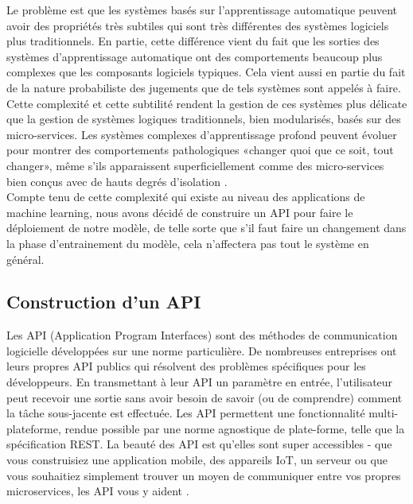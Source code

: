 \documentclass[12pt, french]{report}
\begin{document}
Le problème est que les systèmes basés sur l'apprentissage automatique peuvent avoir des propriétés très subtiles qui sont très différentes des systèmes logiciels plus traditionnels. En partie, cette différence vient du fait que les sorties des systèmes d'apprentissage automatique ont des comportements beaucoup plus complexes que les composants logiciels typiques. Cela vient aussi en partie du fait de la nature probabiliste des jugements que de tels systèmes sont appelés à faire. \\

Cette complexité et cette subtilité rendent la gestion de ces systèmes plus délicate que la gestion de systèmes logiques traditionnels, bien modularisés, basés sur des micro-services. Les systèmes complexes d'apprentissage profond peuvent évoluer pour montrer des comportements pathologiques «changer quoi que ce soit, tout changer», même s'ils apparaissent superficiellement comme des micro-services bien conçus avec de hauts degrés d'isolation \cite{key7}.\\

Compte tenu de cette complexité qui existe au niveau des applications de machine learning, nous avons décidé de construire un API pour faire le déploiement de notre modèle, de telle sorte que s'il faut faire un changement dans la phase d'entrainement du modèle, cela n'affectera pas tout le système en général.  

\subsection{Construction d'un API}
Les API (Application Program Interfaces) sont des méthodes de communication logicielle développées sur une norme particulière. De nombreuses entreprises ont leurs propres API publics qui résolvent des problèmes spécifiques pour les développeurs. En transmettant à leur API un paramètre en entrée, l'utilisateur peut recevoir une sortie sans avoir besoin de savoir (ou de comprendre) comment la tâche sous-jacente est effectuée. Les API permettent une fonctionnalité multi-plateforme, rendue possible par une norme agnostique de plate-forme, telle que la spécification REST. La beauté des API est qu'elles sont super accessibles - que vous construisiez une application mobile, des appareils IoT, un serveur ou que vous souhaitiez simplement trouver un moyen de communiquer entre vos propres microservices, les API vous y aident \cite{key8}.\\
\end{document}
